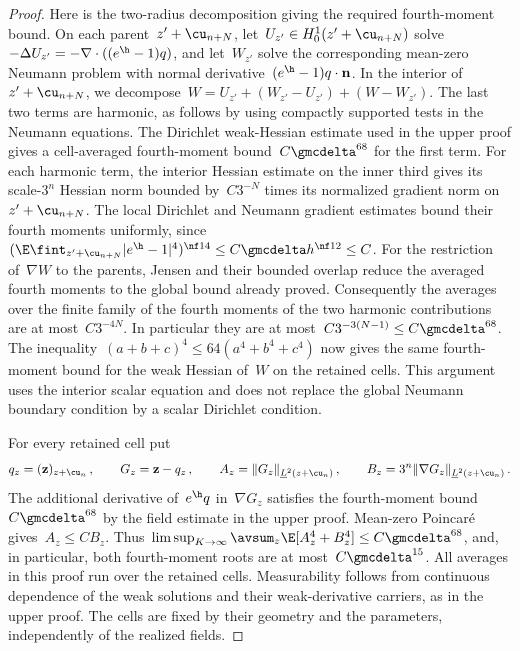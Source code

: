 \documentclass[11pt]{amsart}
\begin{document}
\begin{proof}
Here is the two-radius decomposition giving the required fourth-moment bound. On each parent~$z'+\cu_{n+N}$, let~$U_{z'}\in H_0^1(z'+\cu_{n+N})$ solve~$-\Delta U_{z'}=-\nabla\cdot((e^\h-1)q)$, and let~$W_{z'}$ solve the corresponding mean-zero Neumann problem with normal derivative~$(e^\h-1)q\cdot\mathbf n$. In the interior of~$z'+\cu_{n+N}$, we decompose~$W=U_{z'}+(W_{z'}-U_{z'})+(W-W_{z'})$. The last two terms are harmonic, as follows by using compactly supported tests in the Neumann equations. The Dirichlet weak-Hessian estimate used in the upper proof gives a cell-averaged fourth-moment bound~$C\gmcdelta^{68}$ for the first term. For each harmonic term, the interior Hessian estimate on the inner third gives its scale-$3^n$ Hessian norm bounded by~$C3^{-N}$ times its normalized gradient norm on~$z'+\cu_{n+N}$. The local Dirichlet and Neumann gradient estimates bound their fourth moments uniformly, since~$(\E\fint_{z'+\cu_{n+N}}|e^\h-1|^4)^{\nf14}\leq C\gmcdelta h^{\nf12}\leq C$. For the restriction of~$\nabla W$ to the parents, Jensen and their bounded overlap reduce the averaged fourth moments to the global bound already proved. Consequently the averages over the finite family of the fourth moments of the two harmonic contributions are at most~$C3^{-4N}$. In particular they are at most~$C3^{-3(N-1)}\leq C\gmcdelta^{68}$. The inequality~$(a+b+c)^4\leq64(a^4+b^4+c^4)$ now gives the same fourth-moment bound for the weak Hessian of~$W$ on the retained cells. This argument uses the interior scalar equation and does not replace the global Neumann boundary condition by a scalar Dirichlet condition.

\smallskip

For every retained cell put
\begin{equation*}
	q_z=(\mathbf z)_{z+\cu_n}\,,\qquad
	G_z=\mathbf z-q_z\,,\qquad
	A_z=\|G_z\|_{\underline L^2(z+\cu_n)}\,,\qquad
	B_z=3^n\|\nabla G_z\|_{\underline L^2(z+\cu_n)}\,.
\end{equation*}
The additional derivative of~$e^\h q$ in~$\nabla G_z$ satisfies the fourth-moment bound~$C\gmcdelta^{68}$ by the field estimate in the upper proof. Mean-zero Poincar\'e gives~$A_z\leq CB_z$. Thus~$\limsup_{K\to\infty}\avsum_z\E[A_z^4+B_z^4]\leq C\gmcdelta^{68}$, and, in particular, both fourth-moment roots are at most~$C\gmcdelta^{15}$. All averages in this proof run over the retained cells. Measurability follows from continuous dependence of the weak solutions and their weak-derivative carriers, as in the upper proof. The cells are fixed by their geometry and the parameters, independently of the realized fields.


\end{proof}
\end{document}
